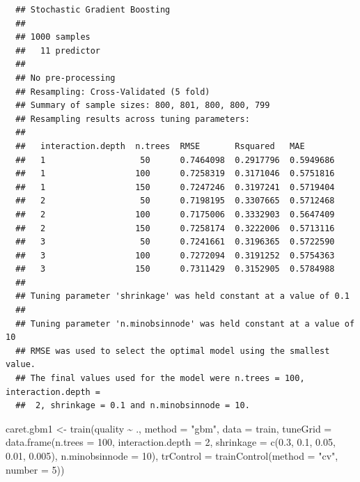 \documentclass[
]{book}
\newenvironment{Shaded}{\begin{snugshade}}{\end{snugshade}}
\newcommand{\AttributeTok}[1]{\textcolor[rgb]{0.77,0.63,0.00}{#1}}
\newcommand{\DecValTok}[1]{\textcolor[rgb]{0.00,0.00,0.81}{#1}}
\newcommand{\FloatTok}[1]{\textcolor[rgb]{0.00,0.00,0.81}{#1}}
\newcommand{\FunctionTok}[1]{\textcolor[rgb]{0.00,0.00,0.00}{#1}}
\newcommand{\NormalTok}[1]{#1}
\newcommand{\OtherTok}[1]{\textcolor[rgb]{0.56,0.35,0.01}{#1}}
\newcommand{\SpecialCharTok}[1]{\textcolor[rgb]{0.00,0.00,0.00}{#1}}
\newcommand{\StringTok}[1]{\textcolor[rgb]{0.31,0.60,0.02}{#1}}
\theoremstyle{break}
\theoremstyle{nonumberplain}
\begin{document}
\begin{verbatim}
  ## Stochastic Gradient Boosting 
  ## 
  ## 1000 samples
  ##   11 predictor
  ## 
  ## No pre-processing
  ## Resampling: Cross-Validated (5 fold) 
  ## Summary of sample sizes: 800, 801, 800, 800, 799 
  ## Resampling results across tuning parameters:
  ## 
  ##   interaction.depth  n.trees  RMSE       Rsquared   MAE      
  ##   1                   50      0.7464098  0.2917796  0.5949686
  ##   1                  100      0.7258319  0.3171046  0.5751816
  ##   1                  150      0.7247246  0.3197241  0.5719404
  ##   2                   50      0.7198195  0.3307665  0.5712468
  ##   2                  100      0.7175006  0.3332903  0.5647409
  ##   2                  150      0.7258174  0.3222006  0.5713116
  ##   3                   50      0.7241661  0.3196365  0.5722590
  ##   3                  100      0.7272094  0.3191252  0.5754363
  ##   3                  150      0.7311429  0.3152905  0.5784988
  ## 
  ## Tuning parameter 'shrinkage' was held constant at a value of 0.1
  ## 
  ## Tuning parameter 'n.minobsinnode' was held constant at a value of 10
  ## RMSE was used to select the optimal model using the smallest value.
  ## The final values used for the model were n.trees = 100, interaction.depth =
  ##  2, shrinkage = 0.1 and n.minobsinnode = 10.
\end{verbatim}

\begin{Shaded}
\begin{Highlighting}[]
\NormalTok{caret.gbm1 }\OtherTok{\textless{}{-}} \FunctionTok{train}\NormalTok{(quality }\SpecialCharTok{\textasciitilde{}}\NormalTok{ ., }\AttributeTok{method =} \StringTok{"gbm"}\NormalTok{, }\AttributeTok{data =}\NormalTok{ train,}
   \AttributeTok{tuneGrid =} \FunctionTok{data.frame}\NormalTok{(}\AttributeTok{n.trees =}  \DecValTok{100}\NormalTok{, }\AttributeTok{interaction.depth =} \DecValTok{2}\NormalTok{, }
                        \AttributeTok{shrinkage =} \FunctionTok{c}\NormalTok{(}\FloatTok{0.3}\NormalTok{, }\FloatTok{0.1}\NormalTok{, }\FloatTok{0.05}\NormalTok{, }\FloatTok{0.01}\NormalTok{, }\FloatTok{0.005}\NormalTok{),}
                        \AttributeTok{n.minobsinnode =} \DecValTok{10}\NormalTok{),}
   \AttributeTok{trControl =} \FunctionTok{trainControl}\NormalTok{(}\AttributeTok{method =} \StringTok{"cv"}\NormalTok{, }\AttributeTok{number =} \DecValTok{5}\NormalTok{))}
\end{Highlighting}
\end{Shaded}
\end{document}
